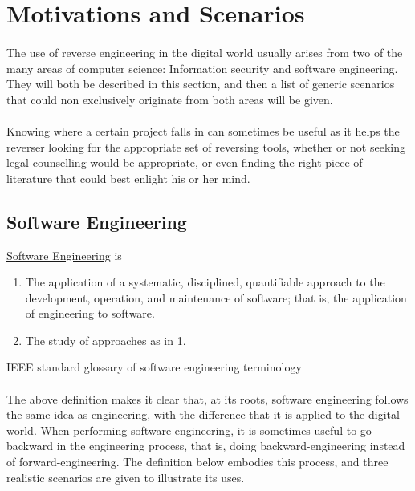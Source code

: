 \section{Motivations and Scenarios}
\paragraph{}
The use of reverse engineering in the digital world usually arises from two of the many areas of computer science: Information security and software engineering. They will both be described in this section, and then a list of generic scenarios that could non exclusively originate from both areas will be given.

\paragraph{}
Knowing where a certain project falls in can sometimes be useful as it helps the reverser looking for the appropriate set of reversing tools, whether or not seeking legal counselling would be appropriate, or even finding the right piece of literature that could best enlight his or her mind. 

\pagebreak

\subsection{Software Engineering}
\begin{framed}
	\begin{definition}
		\underline{Software Engineering} is
		\begin{enumerate}
			\item The application of a systematic, disciplined, quantifiable approach to the development, operation, and maintenance of software; that is, the application of engineering to software.
			\item The study of approaches as in 1.
		\end{enumerate}
		\begin{flushright}
			\hfill{}{IEEE standard glossary of software engineering terminology~\cite{radatz1990ieee}}
		\end{flushright}
	\end{definition}
\end{framed}

\paragraph{}
The above definition makes it clear that, at its roots, software engineering follows the same idea as engineering, with the difference that it is applied to the digital world. When performing software engineering, it is sometimes useful to go backward in the engineering process, that is, doing backward-engineering instead of forward-engineering. The definition below embodies this process, and three realistic scenarios are given to illustrate its uses.

